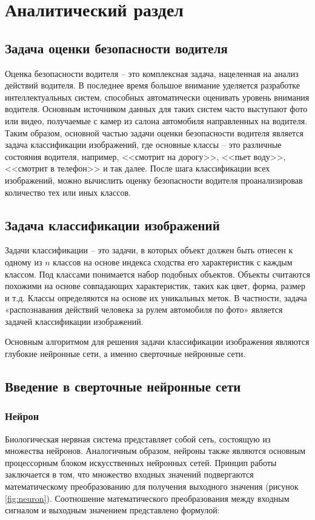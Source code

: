\section{Аналитический раздел}
\subsection{Задача оценки безопасности водителя}
Оценка безопасности водителя -- это комплексная задача, нацеленная на анализ действий водителя. В последнее время большое внимание уделяется разработке интеллектуальных систем, способных автоматически оценивать уровень внимания водителя. Основным источником данных для таких систем часто выступают фото или видео, получаемые с камер из салона автомобиля направленных на водителя. Таким образом, основной частью задачи оценки безопасности водителя является задача классификации изображений, где основные классы -- это различные состояния водителя, например, <<смотрит на дорогу>>, <<пьет воду>>, <<смотрит в телефон>> и так далее. После шага классификации всех изображений, можно вычислить оценку безопасности водителя проанализировав количество тех или иных классов.

\subsection{Задача классификации изображений}
Задачи классификации -- это задачи, в которых объект должен быть отнесен к одному из $n$ классов на основе индекса сходства его характеристик с каждым классом. Под классами понимается набор подобных объектов. Объекты
считаются похожими на основе совпадающих характеристик, таких как цвет, форма, размер и т.д. Классы определяются на основе их уникальных меток. В частности, задача «распознавания действий человека за рулем автомобиля по фото» является задачей классификации изображений.

Основным алгоритмом для решения задачи классификации изображения являются глубокие нейронные сети, а именно сверточные нейронные сети.

\subsection{Введение в сверточные нейронные сети}
\subsubsection{Нейрон}

Биологическая нервная система представляет собой сеть, состоящую из множества нейронов. Аналогичным образом, нейроны также являются основным процессорным блоком искусственных нейронных сетей. Принцип работы заключается в том, что множество входных значений подвергаются математическому преобразованию для получения выходного значения (рисунок \ref{fig:neuron}). Соотношение математического преобразования между входным сигналом и выходным значением представлено формулой:

